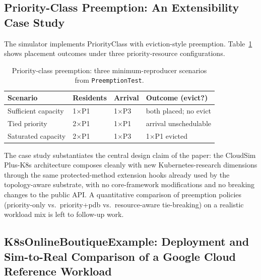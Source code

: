 \documentclass[ASNA,twocolumn]{USG}
\newcommand{\ckm}{CloudSim Plus-K8s\xspace}
\begin{document}
    \subsection{Priority-Class Preemption: An Extensibility Case Study}
    \label{sec:priority-case-study}

    The simulator implements PriorityClass with eviction-style
    preemption. Table~\ref{tab:priority-scenario} shows placement
    outcomes under three priority-resource configurations.

    \begin{table}[!t]
        \centering
        \caption{Priority-class preemption: three minimum-reproducer
        scenarios from \texttt{PreemptionTest}.
        \label{tab:priority-scenario}}
        \footnotesize
        \setlength{\tabcolsep}{3pt}
        \begin{tabular*}{\columnwidth}{@{\extracolsep{\fill}}llll@{}}
\toprule
\textbf{Scenario} & \textbf{Residents} & \textbf{Arrival} & \textbf{Outcome (evict?)} \\
\midrule
Sufficient capacity & 1$\times$P1 & 1$\times$P3 & both placed; no evict \\
Tied priority       & 2$\times$P1 & 1$\times$P1 & arrival unschedulable \\
Saturated capacity  & 2$\times$P1 & 1$\times$P3 & 1$\times$P1 evicted \\
\bottomrule
        \end{tabular*}
    \end{table}

    The case study substantiates the central design claim of the paper:
    the \ckm architecture composes cleanly with new
    Kubernetes-research dimensions through the same protected-method
    extension hooks already used by the topology-aware substrate, with no
    core-framework modifications and no breaking changes to the public
    API. A quantitative comparison of preemption policies (priority-only
    vs.\ priority+pdb vs.\ resource-aware tie-breaking) on a realistic
    workload mix is left to follow-up work.

    \subsection{K8sOnlineBoutiqueExample: Deployment and Sim-to-Real Comparison of a Google Cloud Reference Workload}
    \label{sec:online-boutique}
\end{document}
